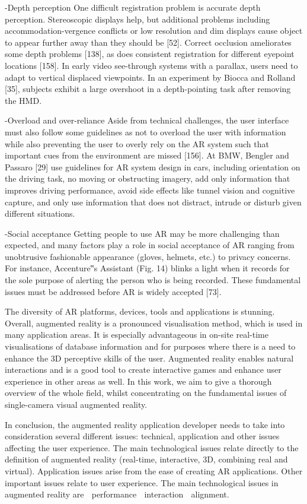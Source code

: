 -Depth perception
One difficult registration problem is accurate depth perception.
Stereoscopic displays help, but additional problems
including accommodation-vergence conflicts or low resolution
and dim displays cause object to appear further away
than they should be [52]. Correct occlusion ameliorates some
depth problems [138], as does consistent registration for
different eyepoint locations [158].
In early video see-through systems with a parallax, users
need to adapt to vertical displaced viewpoints. In an experiment
by Biocca and Rolland [35], subjects exhibit a large
overshoot in a depth-pointing task after removing the HMD.

-Overload and over-reliance
Aside from technical challenges, the user interface must
also follow some guidelines as not to overload the user with
information while also preventing the user to overly rely on
the AR system such that important cues from the environment
are missed [156]. At BMW, Bengler and Passaro [29] use
guidelines for AR system design in cars, including orientation
on the driving task, no moving or obstructing imagery,
add only information that improves driving performance,
avoid side effects like tunnel vision and cognitive capture,
and only use information that does not distract, intrude or
disturb given different situations.

-Social acceptance
Getting people to use AR may be more challenging than
expected, and many factors play a role in social acceptance of
AR ranging from unobtrusive fashionable appearance
(gloves, helmets, etc.) to privacy concerns. For instance,
Accenture‟s Assistant (Fig. 14) blinks a light when it records
for the sole purpose of alerting the person who is being recorded.
These fundamental issues must be addressed before
AR is widely accepted [73].

The diversity of AR platforms, devices, tools and applications is stunning. Overall,
augmented reality is a pronounced visualisation method, which is used in many
application areas. It is especially advantageous in on-site real-time visualisations
of database information and for purposes where there is a need to enhance the
3D perceptive skills of the user. Augmented reality enables natural interactions
and is a good tool to create interactive games and enhance user experience in
other areas as well. In this work, we aim to give a thorough overview of the whole
field, whilst concentrating on the fundamental issues of single-camera visual augmented
reality.


In conclusion, the augmented reality application developer needs to take into consideration several different issues: technical, application and other issues affecting the user experience. The main technological issues relate directly to the definition of augmented reality (real-time, interactive, 3D, combining real and virtual). Application issues arise from the ease of creating AR applications. Other important issues relate to user experience. The main technological issues in augmented reality are 􀁸 performance 􀁸 interaction 􀁸 alignment.

